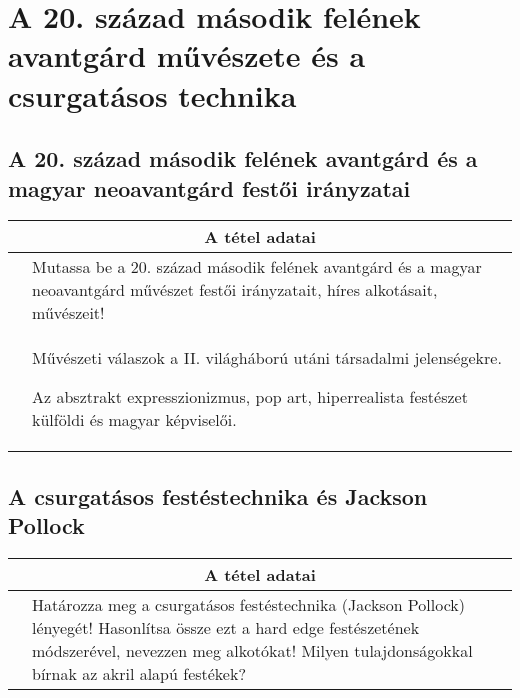 \chapter{A 20. század második felének avantgárd művészete és a csurgatásos technika}
\label{ch:19_avantgard_20_szazad_masodik_fele}

\section{A 20. század második felének avantgárd és a magyar neoavantgárd festői irányzatai}

\begin{center}
	\begin{longtable}{ | p{} | p{} | }
		
		\hline
		\multicolumn{2}{|c|}{\textbf{A tétel adatai}}
		\\ \hline
		\hline
		
		\centering{Tétel teljes címe}
		& 
		Mutassa be a 20. század második felének avantgárd és a magyar neoavantgárd művészet festői irányzatait, híres alkotásait, művészeit!
		\\ \hline
		
		\centering{Jegyzetek}
		&
		\begin{compactitem}
			\item Művészeti válaszok a II. világháború utáni társadalmi jelenségekre.
			\item Az absztrakt expresszionizmus, pop art, hiperrealista festészet külföldi és magyar képviselői.
		\end{compactitem}
		\\\hline
		
	\end{longtable}
\end{center}

\cleardoublepage


\section{A csurgatásos festéstechnika és Jackson Pollock}

\begin{center}
	\begin{longtable}{ | p{} | p{} | }
		
		\hline
		\multicolumn{2}{|c|}{\textbf{A tétel adatai}}
		\\ \hline
		\hline
		
		\centering{Tétel teljes címe} 
		&
		Határozza meg a csurgatásos festéstechnika (Jackson Pollock) lényegét! Hasonlítsa össze ezt a hard edge festészetének módszerével, nevezzen meg alkotókat! Milyen tulajdonságokkal bírnak az akril alapú festékek?
		\\ \hline
		
	\end{longtable}
\end{center}
